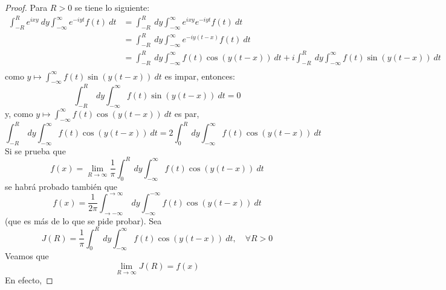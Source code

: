 \documentclass[12pt]{report}
\theoremstyle{largebreak}
\begin{document}
    \begin{proof}
        Para $R>0$ se tiene lo siguiente:
        \begin{equation*}
            \begin{split}
                \int_{ -R}^{ R}e^{ixy}\:dy\int_{-\infty}^\infty e^{ -iyt}f(t)\:dt&=\int_{ -R}^{ R}\:dy\int_{-\infty}^\infty e^{ixy}e^{ -iyt}f(t)\:dt\\
                &=\int_{ -R}^{ R}\:dy\int_{-\infty}^\infty e^{ -iy(t-x)}f(t)\:dt\\
                &=\int_{ -R}^{ R}\:dy\int_{-\infty}^\infty f(t)\cos(y(t-x))\:dt+i\int_{ -R}^{ R}\:dy\int_{-\infty}^\infty f(t)\sin(y(t-x))\:dt\\
            \end{split}
        \end{equation*}
        como $y\mapsto\int_{-\infty}^\infty f(t)\sin(y(t-x))\:dt$ es impar, entonces:
        \begin{equation*}
            \int_{ -R}^{ R}\:dy\int_{-\infty}^\infty f(t)\sin(y(t-x))\:dt=0
        \end{equation*}
        y, como $y\mapsto\int_{-\infty}^\infty f(t)\cos(y(t-x))\:dt$ es par,
        \begin{equation*}
            \int_{ -R}^{ R}\:dy\int_{-\infty}^\infty f(t)\cos(y(t-x))\:dt=2\int_{0}^{ R}\:dy\int_{-\infty}^\infty f(t)\cos(y(t-x))\:dt
        \end{equation*}
        Si se prueba que
        \begin{equation*}
            f(x)=\lim_{ R\rightarrow\infty}\frac{1}{\pi}\int_{0}^{ R}\:dy\int_{-\infty}^\infty f(t)\cos(y(t-x))\:dt
        \end{equation*}
        se habrá probado también que
        \begin{equation*}
            f(x)=\frac{1}{2\pi}\int_{ \rightarrow-\infty}^{\rightarrow\infty}\:dy\int_{ -\infty}^{ -\infty}f(t)\cos(y(t-x))\:dt
        \end{equation*}
        (que es más de lo que se pide probar). Sea
        \begin{equation*}
            J(R)=\frac{1}{\pi}\int_0^R\:dy\int_{-\infty}^\infty f(t)\cos(y(t-x))\:dt,\quad\forall R>0
        \end{equation*}
        Veamos que
        \begin{equation*}
            \lim_{ R\rightarrow\infty}J(R)=f(x)
        \end{equation*}
        En efecto, 
    \end{proof}
\end{document}
